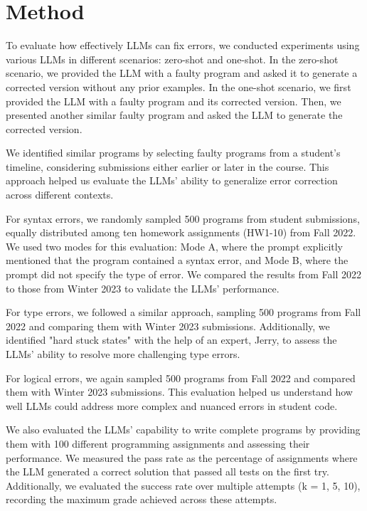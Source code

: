\documentclass[sigconf,authordraft]{acmart}
\begin{document}
\section{Method}


To evaluate how effectively LLMs can fix errors, we conducted experiments using various LLMs in different scenarios: zero-shot and one-shot. In the zero-shot scenario, we provided the LLM with a faulty program and asked it to generate a corrected version without any prior examples. In the one-shot scenario, we first provided the LLM with a faulty program and its corrected version. Then, we presented another similar faulty program and asked the LLM to generate the corrected version.

We identified similar programs by selecting faulty programs from a student's timeline, considering submissions either earlier or later in the course. This approach helped us evaluate the LLMs' ability to generalize error correction across different contexts.

For syntax errors, we randomly sampled 500 programs from student submissions, equally distributed among ten homework assignments (HW1-10) from Fall 2022. We used two modes for this evaluation: Mode A, where the prompt explicitly mentioned that the program contained a syntax error, and Mode B, where the prompt did not specify the type of error. We compared the results from Fall 2022 to those from Winter 2023 to validate the LLMs' performance.

For type errors, we followed a similar approach, sampling 500 programs from Fall 2022 and comparing them with Winter 2023 submissions. Additionally, we identified "hard stuck states" with the help of an expert, Jerry, to assess the LLMs' ability to resolve more challenging type errors.

For logical errors, we again sampled 500 programs from Fall 2022 and compared them with Winter 2023 submissions. This evaluation helped us understand how well LLMs could address more complex and nuanced errors in student code.

We also evaluated the LLMs' capability to write complete programs by providing them with 100 different programming assignments and assessing their performance. We measured the pass rate as the percentage of assignments where the LLM generated a correct solution that passed all tests on the first try. Additionally, we evaluated the success rate over multiple attempts (k = 1, 5, 10), recording the maximum grade achieved across these attempts.
\end{document}
